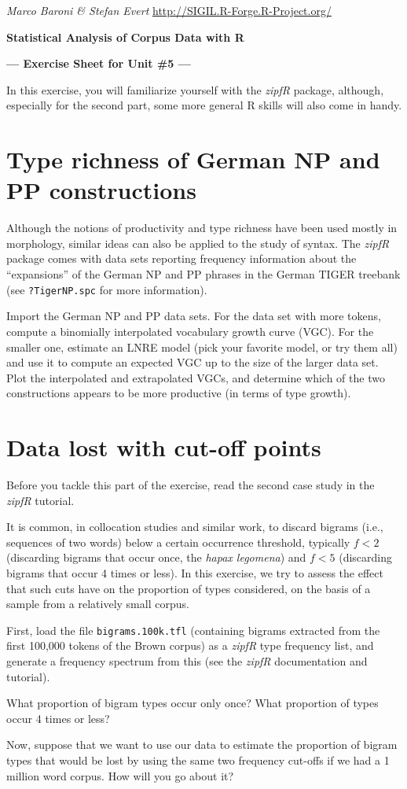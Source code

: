 \documentclass[a4paper,12pt]{article}
\begin{document}
\emph{Marco Baroni \& Stefan Evert} \hfill %
{\small \url{http://SIGIL.R-Forge.R-Project.org/}}

\begin{center}
  \textbf{\large Statistical Analysis of Corpus Data with R}

  \textbf{\large --- Exercise Sheet for Unit \#5 ---}
\end{center}


In this exercise, you will familiarize yourself with the \emph{zipfR}
package, although, especially for the second part, some more general R
skills will also come in handy.  

\section{Type richness of German NP and PP constructions}

Although the notions of productivity and type richness have been used mostly
in morphology, similar ideas can also be applied to the study of syntax.  The
\emph{zipfR} package comes with data sets reporting frequency information
about the ``expansions'' of the German NP and PP phrases in the German TIGER
treebank (see \texttt{?TigerNP.spc} for more information).

Import the German NP and PP data sets. For the data set with more tokens,
compute a binomially interpolated vocabulary growth curve (VGC).  For the
smaller one, estimate an LNRE model (pick your favorite model, or try them
all) and use it to compute an expected VGC up to the size of the larger data
set.  Plot the interpolated and extrapolated VGCs, and determine which of the
two constructions appears to be more productive (in terms of type growth).


\section{Data lost with cut-off points}

Before you tackle this part of the exercise, read the second case study in
the \emph{zipfR} tutorial.

It is common, in collocation studies and similar work, to discard bigrams
(i.e., sequences of two words) below a certain occurrence threshold, typically
$f < 2$ (discarding bigrams that occur once, the \emph{hapax legomena}) and $f
< 5$ (discarding bigrams that occur 4 times or less).  In this exercise, we
try to assess the effect that such cuts have on the proportion of types
considered, on the basis of a sample from a relatively small corpus.

First, load the file \texttt{bigrams.100k.tfl} (containing bigrams extracted
from the first 100,000 tokens of the Brown corpus) as a \emph{zipfR} type
frequency list, and generate a frequency spectrum from this (see the
\emph{zipfR} documentation and tutorial).

What proportion of bigram types occur only once? What proportion of types
occur 4 times or less?

Now, suppose that we want to use our data to estimate the proportion
of bigram types that would be lost by using the same two frequency
cut-offs if we had a 1 million word corpus.  How will you go about it?
\end{document}
